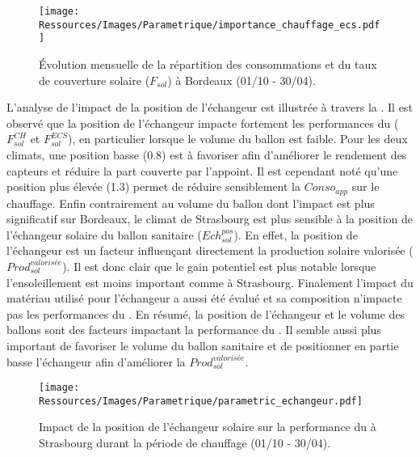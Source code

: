 \begin{figure}
    \centering
    \texttt{[image: Ressources/Images/Parametrique/importance\_chauffage\_ecs.pdf]}
    \caption[Évolution mensuelle de la répartition des consommations à Bordeaux]
            {Évolution mensuelle de la répartition des consommations et du taux
             de couverture solaire ($F_{sol}$) à Bordeaux (01/10 - 30/04).}
    \label{fig:importance_chauffage_ecs}
\end{figure}

L’analyse de l’impact de la position de l’échangeur est illustrée à travers la
. Il est observé que la position de l’échangeur impacte
fortement les performances du  ($F_{sol}^{CH}$ et $F_{sol}^{ECS}$), en particulier
lorsque le volume du ballon est faible. Pour les deux climats, une position basse
(\num{0.8}) est à favoriser afin d’améliorer le rendement des capteurs et réduire la part
couverte par l’appoint. Il est cependant noté qu’une position plus élevée (\num{1.3})
permet de réduire sensiblement la $Conso_{app}$ sur le chauffage.
Enfin contrairement au volume du ballon dont l’impact est plus significatif sur Bordeaux, le
climat de Strasbourg est plus sensible à la position de l’échangeur solaire du ballon
sanitaire ($Ech_{sol}^{pos}$). En effet, la position de l’échangeur
est un facteur influençant directement la production solaire valorisée ($Prod_{sol}^{valorisée}$). Il est donc clair que le gain potentiel
est plus notable lorsque l’ensoleillement est moins important comme à Strasbourg.
Finalement l’impact du matériau utilisé pour l’échangeur a aussi été évalué et sa
composition n’impacte pas les performances du .
\textbf{}
En résumé, la position de l’échangeur et le volume des ballons sont des facteurs
impactant la performance du . Il semble aussi plus important de favoriser
le volume du ballon sanitaire et de positionner en partie basse l’échangeur afin
d’améliorer la $Prod_{sol}^{valorisée}$.

\begin{figure}
    \centering
    \texttt{[image: Ressources/Images/Parametrique/parametric\_echangeur.pdf]}
    \caption[Impact de la position de l’échangeur solaire sur la performance du ]
            {Impact de la position de l’échangeur solaire sur la performance
             du  à Strasbourg durant la période de chauffage (01/10 - 30/04).}
    \label{fig:impact_pos_ech}
\end{figure}


